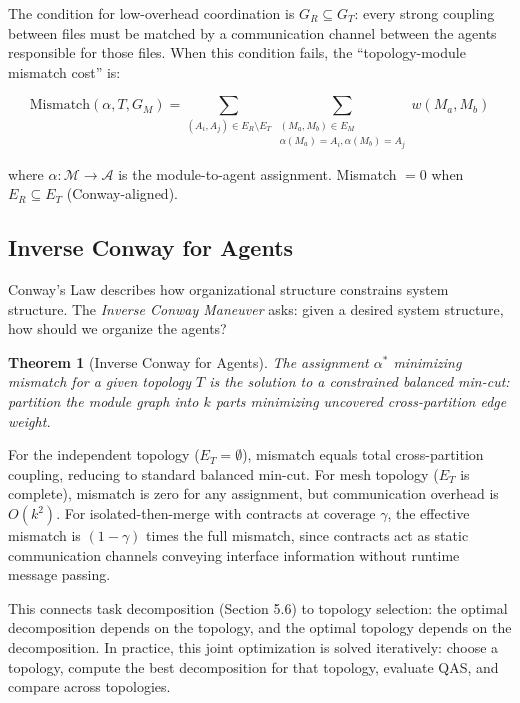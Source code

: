 \documentclass[11pt, a4paper, logo, copyright]{googledeepmind}
\newtheorem{theorem}{Theorem}[section]
\begin{document}
The condition for low-overhead coordination is $G_R \subseteq G_T$: every strong coupling between files must be matched by a communication channel between the agents responsible for those files. When this condition fails, the ``topology-module mismatch cost'' is:

\begin{equation}
    \mathrm{Mismatch}(\alpha, T, G_M) = \sum_{(A_i, A_j) \in E_R \setminus E_T} \sum_{\substack{(M_a, M_b) \in E_M \\ \alpha(M_a)=A_i, \alpha(M_b)=A_j}} w(M_a, M_b)
\end{equation}

where $\alpha: \mathcal{M} \to \mathcal{A}$ is the module-to-agent assignment. Mismatch $= 0$ when $E_R \subseteq E_T$ (Conway-aligned).

\subsection{Inverse Conway for Agents}

Conway's Law describes how organizational structure constrains system structure. The \emph{Inverse Conway Maneuver} asks: given a desired system structure, how should we organize the agents?

\begin{theorem}[Inverse Conway for Agents]
\label{thm:inverse-conway}
The assignment $\alpha^*$ minimizing mismatch for a given topology $T$ is the solution to a constrained balanced min-cut: partition the module graph into $k$ parts minimizing uncovered cross-partition edge weight.
\end{theorem}

For the independent topology ($E_T = \emptyset$), mismatch equals total cross-partition coupling, reducing to standard balanced min-cut. For mesh topology ($E_T$ is complete), mismatch is zero for any assignment, but communication overhead is $O(k^2)$. For isolated-then-merge with contracts at coverage $\gamma$, the effective mismatch is $(1-\gamma)$ times the full mismatch, since contracts act as static communication channels conveying interface information without runtime message passing.

This connects task decomposition (Section 5.6) to topology selection: the optimal decomposition depends on the topology, and the optimal topology depends on the decomposition. In practice, this joint optimization is solved iteratively: choose a topology, compute the best decomposition for that topology, evaluate QAS, and compare across topologies.
\end{document}
